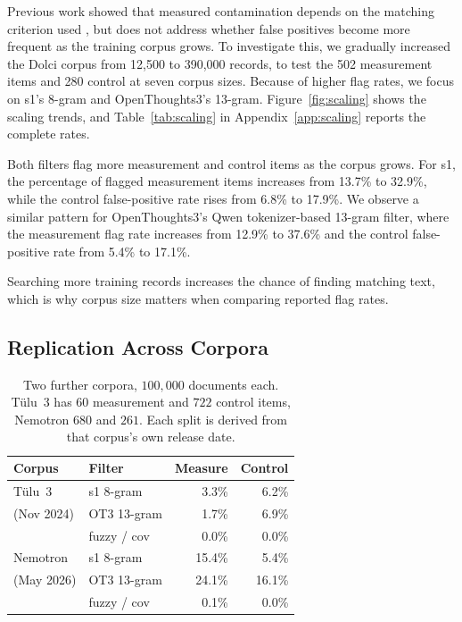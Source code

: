 \documentclass[11pt]{article}
\begin{document}
Previous work showed that measured contamination depends on the matching criterion used \citep{singh2024evaluationdatacontaminationllms}, but does not address whether false positives become more frequent as the training corpus grows.
To investigate this, we gradually increased the Dolci corpus from 12,500 to 390,000 records, to test the 502 measurement items and 280 control at seven corpus sizes. Because of higher flag rates, we focus on s1's 8-gram and OpenThoughts3's 13-gram. Figure~\ref{fig:scaling} shows the scaling trends, and Table~\ref{tab:scaling} in Appendix~\ref{app:scaling} reports the complete rates.

Both filters flag more measurement and control items as the corpus grows. For s1, the percentage of flagged measurement items increases from 13.7\% to 32.9\%, while the control false-positive rate rises from 6.8\% to 17.9\%. We observe a similar pattern for OpenThoughts3's Qwen tokenizer-based 13-gram filter, where the measurement flag rate increases from 12.9\% to 37.6\% and the control false-positive rate from 5.4\% to 17.1\%.

Searching more training records increases the chance of finding matching text, which is why corpus size matters when comparing reported flag rates.

\subsection{Replication Across Corpora}
\label{sec:replication}

\begin{table}[t]
  \centering
  \small
  \begin{tabular}{@{}llrr@{}}
    \toprule
    Corpus & Filter & Measure & Control \\
    \midrule
    T\"ulu~3    & s1 8-gram    & 3.3\%  & 6.2\%  \\
    (Nov 2024)  & OT3 13-gram  & 1.7\%  & 6.9\%  \\
                & fuzzy / cov  & 0.0\%  & 0.0\%  \\
    \midrule
    Nemotron    & s1 8-gram    & 15.4\% & 5.4\%  \\
    (May 2026)  & OT3 13-gram  & 24.1\% & 16.1\% \\
                & fuzzy / cov  & 0.1\%  & 0.0\%  \\
    \bottomrule
  \end{tabular}
  \caption{Two further corpora, $100{,}000$ documents each. T\"ulu~3 has $60$ measurement and $722$ control items, Nemotron $680$ and $261$. Each split is derived from that corpus's own release date.}
  \label{tab:corpora}
\end{table}
\end{document}

